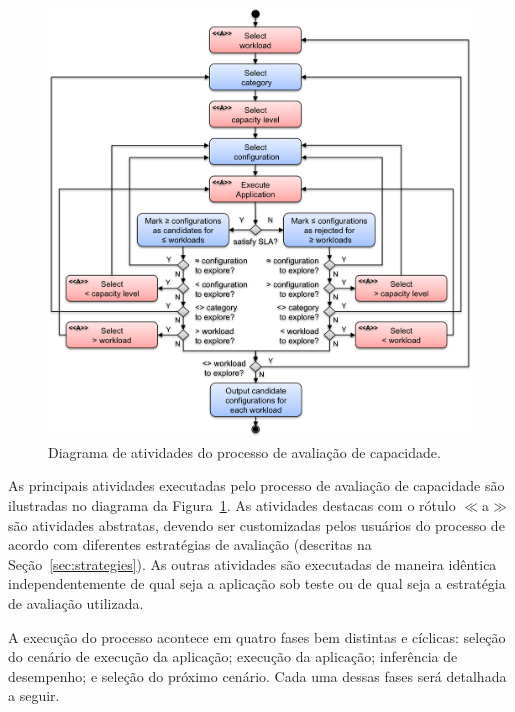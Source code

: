\documentclass[10pt,conference,compsocconf]{IEEEtran}
\begin{document}
\begin{figure}[t]
  \centering
    \includegraphics[width=\columnwidth]{img/capacity-planning-diagram-v13-1-color-eng}
\caption{\label{fig:process}Diagrama de atividades do processo de avaliação de capacidade.}
\end{figure}


As principais atividades executadas pelo processo de avaliação de capacidade são ilustradas no diagrama da Figura~\ref{fig:process}. As atividades destacas com o rótulo \mbox{\scriptsize\boldmath$\ll${\sc a}$\gg$} são atividades abstratas, devendo ser customizadas pelos usuários do processo de acordo com diferentes estratégias de avaliação (descritas na Seção~\ref{sec:strategies}). As outras atividades são executadas de maneira idêntica independentemente de qual seja a aplicação sob teste ou de qual seja a estratégia de avaliação utilizada. 

A execução do processo acontece em quatro fases bem distintas e cíclicas: seleção do cenário de execução da aplicação; execução da aplicação; inferência de desempenho; e seleção do próximo cenário. Cada uma dessas fases será detalhada a seguir.
\end{document}
